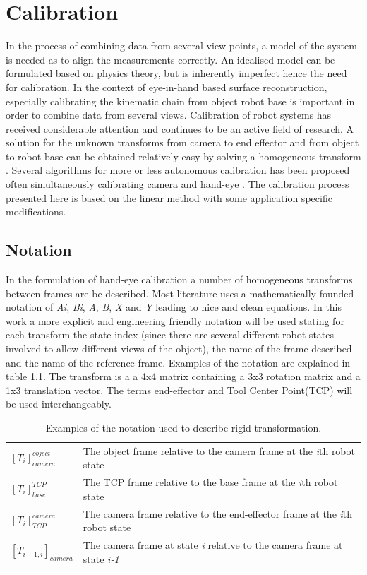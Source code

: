 \chapter{Calibration}
In the process of combining data from several view points, a model of the system is needed as to align the measurements correctly. An idealised model can be formulated based on physics theory, but is inherently imperfect hence the need for calibration. In the context of eye-in-hand based surface reconstruction, especially calibrating the kinematic chain from object robot base is important in order to combine data from several views. Calibration of robot systems has received considerable attention and continues to be an active field of research. A solution for the unknown transforms from camera to end effector and from object to robot base can be obtained relatively easy by solving a homogeneous transform \cite{Shiu1989}. Several algorithms for more or less autonomous calibration has been proposed \cite{Tsai1988, Tsai1989} often simultaneously calibrating camera and hand-eye \cite{Malm2003, Zhao2008, Jordt2009}. The calibration process presented here is based on the linear method \cite{Tsai1988} with some application specific modifications.


\section{Notation}
In the formulation of hand-eye calibration a number of homogeneous transforms between frames are be described. Most literature uses a mathematically founded notation of \textit{Ai}, \textit{Bi}, \textit{A}, \textit{B}, \textit{X} and \textit{Y} leading to nice and clean equations. In this work a more explicit and engineering friendly notation will be used stating for each transform the state index (since there are several different robot states involved to allow different views of the object), the name of the frame described and the name of the reference frame. Examples of the notation are explained in table \ref{tab:notation}. The transform is a a 4x4 matrix containing a 3x3 rotation matrix and a 1x3 translation vector. The terms end-effector and Tool Center Point(TCP) will be used interchangeably.\\

\begin{table}[h]
\caption{Examples of the notation used to describe rigid transformation.}
\begin{tabular}{ll}
\label{tab:notation}
$[T_{i}]_{camera}^{object}$   & The object frame relative to the camera frame at the \textit{i}th robot state          \\[8pt] 
$[T_{i}]_{base}^{TCP}$        & The TCP frame relative to the base frame at the \textit{i}th robot state      \\[8pt] 
$[T_{i}]_{TCP}^{camera}$      & The camera frame relative to the end-effector frame at the \textit{i}th robot state     \\[8pt] 
$[T_{i-1,i}]_{camera}$        & The camera frame at state \textit{i} relative to the camera frame at state \textit{i-1}  \\[8pt]              
\end{tabular}
\end{table}

